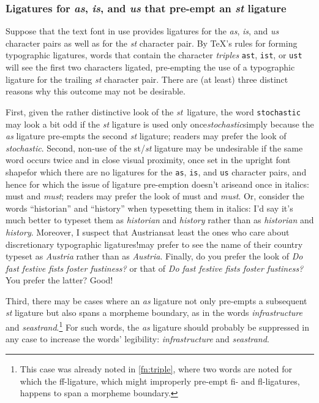 \documentclass[11pt]{article}
\newcommand{\opt}[1]{\texttt{#1}}
\begin{document}
\subsubsection*{Ligatures for \emph{as}, \emph{is}, and \emph{us} that pre-empt an \emph{st} ligature}

Suppose that the text font in use provides ligatures for the \emph{as}, \emph{is}, and \emph{us} character pairs as well as for the \emph{st} character pair. By \TeX's rules for forming typographic ligatures, words that contain the character \emph{triples} \opt{ast}, \opt{ist}, or \opt{ust} will see the first two characters ligated, pre-empting the use of a typographic ligature for the trailing \emph{st} character pair. There are (at least) three distinct reasons why this outcome may not be desirable.

First, given the rather distinctive look of the \emph{st}~ligature, the word \opt{stochastic} may look a bit odd if the \emph{st} ligature is used only once\textemdash\emph{stoch\mbox{as}tic}\textemdash simply because the \emph{as} ligature pre-empts the second \emph{st} ligature; readers may prefer the look of \emph{stocha\mbox{st}ic}. Second, non-use of the st/\emph{st} ligature may be undesirable if the same word occurs twice and in close visual proximity, once set in the upright font shape\textemdash for which there are no ligatures for the \opt{as}, \opt{is}, and \opt{us} character pairs, and hence for which the issue of ligature pre-emption doesn't arise\textemdash and once in italics: must and \emph{m\mbox{us}t}; readers may prefer the look of must and \emph{mu\mbox{st}}. Or, consider the words \enquote{historian} and \enquote{history} when typesetting them in italics: I'd say it's much better to typeset them as \emph{historian} and \emph{history} rather than as \emph{h\mbox{is}torian} and \emph{h\mbox{is}tory}. Moreover, I suspect that Austrians\textemdash at least the ones who care about discretionary typographic ligatures!\textemdash may prefer to see the name of their country typeset as \emph{Austria} rather than as \emph{A\mbox{us}tria}. Finally, do you prefer the look of \emph{Do f\mbox{as}t festive f\mbox{is}ts foster f\mbox{us}tiness?} or that of \emph{Do fast festive fists foster fustiness?} You prefer the latter? Good! 

Third, there may be cases where an \emph{as} ligature not only pre-empts a subsequent \emph{st} ligature but also spans a morpheme boundary, as in the words \emph{infr\mbox{as}tructure} and \emph{se\mbox{as}trand}.\footnote{This case was already noted in \cref{fn:triple}, where two words are noted for which the ff-ligature, which might improperly pre-empt fi- and fl-ligatures, happens to span a morpheme boundary.} For such words, the \emph{as} ligature should probably be suppressed in any case to increase the words' legibility: \emph{infra\mbox{st}ructure} and \emph{sea\mbox{st}rand}.
\end{document}
